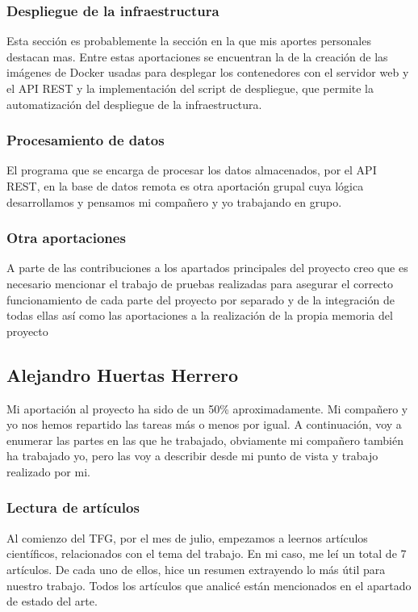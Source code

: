 \subsubsection{Despliegue de la infraestructura}
Esta sección es probablemente la sección en la que mis aportes personales destacan mas. Entre estas aportaciones se encuentran la de la creación de las imágenes de Docker usadas para desplegar los contenedores con el servidor web y el API REST y la implementación del script de despliegue, que permite la automatización del despliegue de la infraestructura.

\subsubsection{Procesamiento de datos}
El programa que se encarga de procesar los datos almacenados, por el API REST, en la base de datos remota es otra aportación grupal cuya lógica desarrollamos y pensamos mi compañero y yo trabajando en grupo.

\subsubsection{Otra aportaciones}
A parte de las contribuciones a los apartados principales del proyecto creo que es necesario mencionar el trabajo de pruebas realizadas para asegurar el correcto funcionamiento de cada parte del proyecto por separado y de la integración de todas ellas así como las aportaciones a la realización de la propia memoria del proyecto

\subsection{Alejandro Huertas Herrero}
Mi aportación al proyecto ha sido de un 50\% aproximadamente. Mi compañero y yo nos hemos repartido las tareas más o menos por igual. A continuación, voy a enumerar las partes en las que he trabajado, obviamente mi compañero también ha trabajado yo, pero las voy a describir desde mi punto de vista y trabajo realizado por mi.

\subsubsection{Lectura de artículos }
Al comienzo del TFG, por el mes de julio, empezamos a leernos artículos científicos, relacionados con el tema del trabajo. En mi caso, me leí un total de 7 artículos. De cada uno de ellos, hice un resumen extrayendo lo más útil para nuestro trabajo. Todos los artículos que analicé están mencionados en el apartado de estado del arte.

